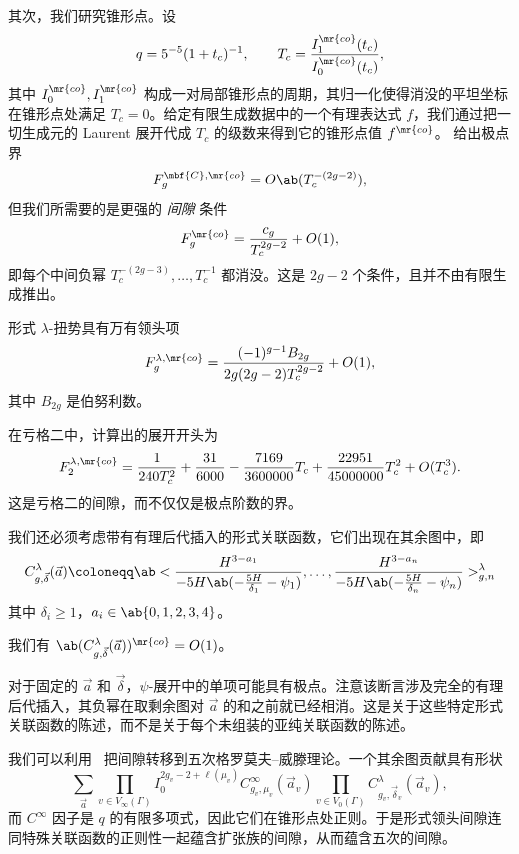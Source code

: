 其次，我们研究锥形点。设
\[ q = 5^{-5}(1+t_c)^{-1}, \qquad T_c = \frac{I_1^{\mr{co}}(t_c)}{I_0^{\mr{co}}(t_c)}, \]
其中 \(I_0^{\mr{co}}, I_1^{\mr{co}}\) 构成一对局部锥形点的周期，其归一化使得消没的平坦坐标在锥形点处满足 \(T_c = 0\)。给定有限生成数据中的一个有理表达式 \(f\)，我们通过把一切生成元的 Laurent 展开代成 \(T_c\) 的级数来得到它的锥形点值 \(f^{\mr{co}}\)。 给出极点界
\[ F_g^{\mbf{C},\mr{co}} = O\ab(T_c^{-(2g-2)}), \]
但我们所需要的是更强的 \textit{间隙} 条件
\[ F_g^{\mr{co}} = \frac{c_g}{T_c^{2g-2}} + O(1), \]
即每个中间负幂 \(T_c^{-(2g-3)}, \ldots, T_c^{-1}\) 都消没。这是 \(2g-2\) 个条件，且并不由有限生成推出。

\begin{conj}[形式锥形点间隙]%
\label{conj:formal conifold gap}
    形式 \(\lambda\)-扭势具有万有领头项
    \[ F_g^{\lambda,\mr{co}} = \frac{(-1)^{g-1}B_{2g}}{2g(2g-2)T_c^{2g-2}} + O(1), \]
    其中 \(B_{2g}\) 是伯努利数。
\end{conj}

\begin{exm}
    在亏格二中，计算出的展开开头为
    \[ F_2^{\lambda,\mr{co}} = \frac{1}{240T_c^2} + \frac{31}{6000} - \frac{7169}{3600000}T_c + \frac{22951}{45000000}T_c^2 + O(T_c^3). \]
    这是亏格二的间隙，而不仅仅是极点阶数的界。
\end{exm}

我们还必须考虑带有有理后代插入的形式关联函数，它们出现在其余图中，即
\[ C^{\lambda}_{g,\vec{\delta}}(\vec{a}) \coloneqq \ab< \frac{H^{3-a_1}}{-5H\ab(-\frac{5H}{\delta_1}-\psi_1)}, \ldots, \frac{H^{3-a_n}}{-5H\ab(-\frac{5H}{\delta_n}-\psi_n)}>^{\lambda}_{g,n} \]
其中 \(\delta_i \geq 1\)，\(a_i \in \ab\{0,1,2,3,4\}\)。

\begin{conj}[带特殊插入的正则性]%
\label{conj:special correlator regularity}
    我们有 \(\ab(C^{\lambda}_{g,\vec{\delta}}(\vec{a}))^{\mr{co}} = O(1)\)。
\end{conj}

对于固定的 \(\vec{a}\) 和 \(\vec{\delta}\)，\(\psi\)-展开中的单项可能具有极点。注意该断言涉及完全的有理后代插入，其负幂在取剩余图对 \(\vec{a}\) 的和之前就已经相消。这是关于这些特定形式关联函数的陈述，而不是关于每个未组装的亚纯关联函数的陈述。

我们可以利用~ 把间隙转移到五次格罗莫夫–威滕理论。一个其余图贡献具有形状
\[ \sum_{\vec{a}} \prod_{v \in V_{\infty}(\Gamma)}I_0^{2g_v-2+\ell(\mu_v)}C^{\infty}_{g_v,\mu_v}(\vec{a}_v)\prod_{v\in V_0(\Gamma)}C^{\lambda}_{g_v,\vec{\delta}_v}(\vec{a}_v), \]
而 \(C^{\infty}\) 因子是 \(q\) 的有限多项式，因此它们在锥形点处正则。于是形式领头间隙连同特殊关联函数的正则性一起蕴含扩张族的间隙，从而蕴含五次的间隙。


